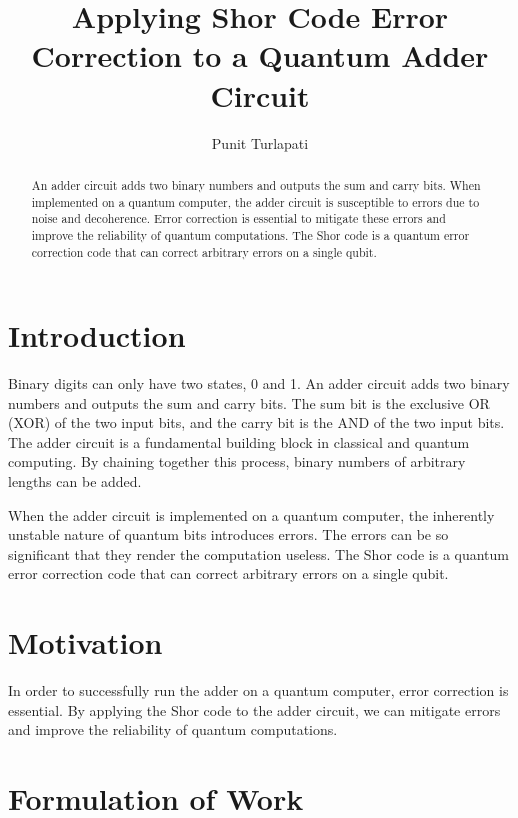 \documentclass[reprint, amsmath, amssymb, aps, letterpaper]{revtex4-2}
\begin{document}

\title{Applying Shor Code Error Correction to a Quantum Adder Circuit}

\author{Punit Turlapati}

\begin{abstract}
    An adder circuit adds two binary numbers and outputs the sum and carry bits. When implemented on a quantum computer, the adder circuit is susceptible to errors due to noise and decoherence. Error correction is essential to mitigate these errors and improve the reliability of quantum computations. The Shor code is a quantum error correction code that can correct arbitrary errors on a single qubit.
\end{abstract}

\maketitle

\section{Introduction}

Binary digits can only have two states, 0 and 1. An adder circuit adds two binary numbers and outputs the sum and carry bits. The sum bit is the exclusive OR (XOR) of the two input bits, and the carry bit is the AND of the two input bits. The adder circuit is a fundamental building block in classical and quantum computing. By chaining together this process, binary numbers of arbitrary lengths can be added.

When the adder circuit is implemented on a quantum computer, the inherently unstable nature of quantum bits introduces errors. The errors can be so significant that they render the computation useless. The Shor code is a quantum error correction code that can correct arbitrary errors on a single qubit.

\section{Motivation}

In order to successfully run the adder on a quantum computer, error correction is essential. By applying the Shor code to the adder circuit, we can mitigate errors and improve the reliability of quantum computations.

\section{Formulation of Work}
\end{document}

